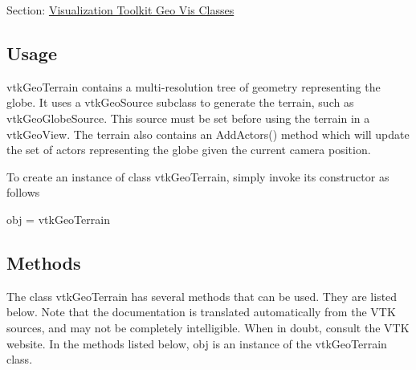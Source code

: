 Section\-: \hyperlink{sec_vtkgeovis}{Visualization Toolkit Geo Vis Classes} \hypertarget{vtkwidgets_vtkxyplotwidget_Usage}{}\subsection{Usage}\label{vtkwidgets_vtkxyplotwidget_Usage}
vtk\-Geo\-Terrain contains a multi-\/resolution tree of geometry representing the globe. It uses a vtk\-Geo\-Source subclass to generate the terrain, such as vtk\-Geo\-Globe\-Source. This source must be set before using the terrain in a vtk\-Geo\-View. The terrain also contains an Add\-Actors() method which will update the set of actors representing the globe given the current camera position.

To create an instance of class vtk\-Geo\-Terrain, simply invoke its constructor as follows \begin{DoxyVerb}  obj = vtkGeoTerrain
\end{DoxyVerb}
 \hypertarget{vtkwidgets_vtkxyplotwidget_Methods}{}\subsection{Methods}\label{vtkwidgets_vtkxyplotwidget_Methods}
The class vtk\-Geo\-Terrain has several methods that can be used. They are listed below. Note that the documentation is translated automatically from the V\-T\-K sources, and may not be completely intelligible. When in doubt, consult the V\-T\-K website. In the methods listed below, {\ttfamily obj} is an instance of the vtk\-Geo\-Terrain class. 

